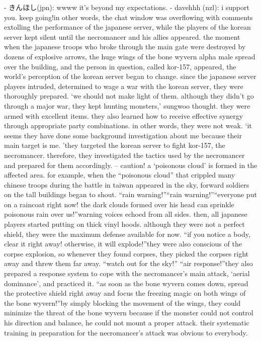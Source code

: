 - きんほし(jpn): wwww it’s beyond my expectations.
- davehhh (nzl): i support you.
 keep going!in other words, the chat window was overflowing with comments extolling the performance of the japanese server, while the players of the korean server kept silent until the necromancer and his allies appeared.
the moment when the japanese troops who broke through the main gate were destroyed by dozens of explosive arrows, the huge wings of the bone wyvern alpha male spread over the building, and the person in question, called kor-157, appeared, the world’s perception of the korean server began to change.
since the japanese server players intruded, determined to wage a war with the korean server, they were thoroughly prepared.
‘we should not make light of them.
 although they didn’t go through a major war, they kept hunting monsters,’ sungwoo thought.
they were armed with excellent items.
 they also learned how to receive effective synergy through appropriate party combinations.
 in other words, they were not weak.
‘it seems they have done some background investigation about me because their main target is me.
’they targeted the korean server to fight kor-157, the necromancer.
 therefore, they investigated the tactics used by the necromancer and prepared for them accordingly.
– caution! a ‘poisonous cloud’ is formed in the affected area.
for example, when the “poisonous cloud” that crippled many chinese troops during the battle in taiwan appeared in the sky, forward soldiers on the tall buildings began to shout.
“rain warning!”“rain warning!”“everyone put on a raincoat right now! the dark clouds formed over his head can sprinkle poisonous rain over us!”warning voices echoed from all sides.
 then, all japanese players started putting on thick vinyl hoods.
 although they were not a perfect shield, they were the maximum defense available for now.
“if you notice a body, clear it right away! otherwise, it will explode!”they were also conscious of the corpse explosion, so whenever they found corpses, they picked the corpses right away and threw them far away.
“watch out for the sky!”
“air response!”they also prepared a response system to cope with the necromancer’s main attack, ‘aerial dominance’, and practiced it.
“as soon as the bone wyvern comes down, spread the protective shield right away and focus the freezing magic on both wings of the bone wyvern!”by simply blocking the movement of the wings, they could minimize the threat of the bone wyvern because if the monster could not control his direction and balance, he could not mount a proper attack.
their systematic training in preparation for the necromancer’s attack was obvious to everybody.
